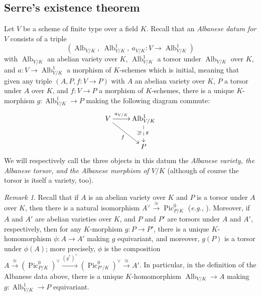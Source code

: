 \documentclass[11pt, reqno]{amsart}
\numberwithin{equation}{section}
\theoremstyle{definition}
\theoremstyle{remark}
\newtheorem{rem}[teo]{Remark}
\def\iso{\cong}
\DeclareMathOperator{\alb}{Alb}
\begin{document}
\subsection{Serre's existence theorem}
 Let $V$ be a scheme of
 finite type over a field $K$.
 Recall that an \emph{Albanese datum for $V$} consists of a triple 
 \begin{equation}\label{E:AlbDat}
 (\alb_{V/K}, \
 \alb^1_{V/K},\ a_{V/K}: V\to \operatorname{Alb}^1_{V/K} )
 \end{equation}
  with $\alb_{V/K}$ an abelian variety over
 $K$, $\alb^1_{V/K}$ a torsor under $\alb_{V/K}$ over $K$, and $a:V\to
 \alb^1_{V/K}$ a morphism of $K$-schemes which is initial, meaning  that
 given any triple $(A, P,f:V\to P)$ with $A$ an abelian variety over $K$, $P$ a
 torsor under $A$ over $K$, and $f:V\to P$ a morphism of $K$-schemes, there is a
 unique  $K$-morphism   $g:\operatorname{Alb}^1_{V/K}\to P$   making the following diagram
 commute:
 $$
 \xymatrix{
  V \ar[r]^<>(0.5){a_{V/K}} \ar[rd]_f&   \operatorname{Alb}^1_{V/K} \ar@{-->}[d]_{\exists !}^g\\
&P
 }
 $$
 We will respectively call the three objects in this datum the \emph{ Albanese variety, the Albanese torsor, and the Albanese morphism of $V/K$} (although of course the torsor is itself a variety, too).
 
 \begin{rem}\label{R:Pic0T}
  Recall that if $A$ is an abelian variety over $K$ and $P$ is a torsor under $A$ over $K$, then there is a natural isomorphism $A^\vee\stackrel{\iso}{\longrightarrow}\operatorname{Pic}^0_{P/K}$ 
 (\emph{e.g.}, \cite[\S 2.1]{olssonAV}).  
 Moreover, if $A$ and $A'$ are abelian varieties over $K$, and $P$ and $P'$ are torsors under $A$ and $A'$, respectively, then for any $K$-morphism $g:P\to P'$, there is a unique $K$-homomorphism $\phi:A\to A'$ making $g$ equivariant, and moreover, $g(P)$ is a torsor under $\phi(A)$; more precisely, $\phi$ is the composition $A\stackrel{\iso}{\longrightarrow} (\operatorname{Pic}^0_{P/K})^\vee \stackrel{(g^*)^\vee}{\to} (\operatorname{Pic}^0_{P'/K})^\vee \stackrel{\iso}{\longrightarrow}A'$.  
 In particular, in the definition of the Albanese data above, 
there is a unique  $K$-homomorphism $\operatorname{Alb}_{V/K}\to A$ making $g:\operatorname{Alb}^1_{V/K}\to P$ equivariant.  
\end{rem}
\end{document}
